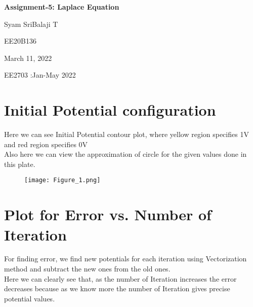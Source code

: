 \documentclass[12pt]{article}
\newcommand\titleofdoc{\textbf{Assignment-5: Laplace Equation}}
\begin{document}
\begin{titlepage}
   \begin{center}
        \vspace*{4cm} %

        \Huge{\titleofdoc} 

        \vspace{3 cm}
        \Large{Syam SriBalaji T}
       
        \vspace{0.25cm}
        \large{EE20B136}
       
        \vspace{3 cm}
        \Large{March 11, 2022}
        
        \vspace{0.25 cm}
        \Large{EE2703 :Jan-May 2022}
       

       \vfill
    \end{center}
\end{titlepage}

\setcounter{page}{2}
\pagestyle{fancy}
\fancyhf{}
\rhead{\thepage}

\section*{Initial Potential configuration}

Here we can see Initial Potential contour plot, where yellow region specifies 1V and red region specifies 0V\\
Also here we can view the approximation of circle for the given values done in this plate.\\

\begin{figure}[h!]
\centering
\texttt{[image: Figure\_1.png]}
\end{figure}

\newpage
\section*{Plot for Error vs. Number of Iteration}

For finding error, we find new potentials for each iteration using Vectorization method and subtract the new ones from the old ones.\\
Here we can clearly see that, as the number of Iteration increases the error decreases because as we know more the number of Iteration gives precise potential values.\\
\end{document}
